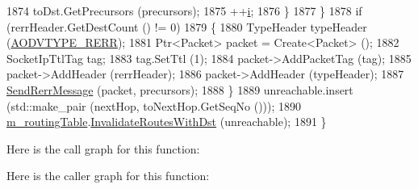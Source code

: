 \begin{DoxyCode}
1874           toDst.GetPrecursors (precursors);
1875           ++\hyperlink{bernuolliDistribution_8m_a6f6ccfcf58b31cb6412107d9d5281426}{i};
1876         \}
1877     \}
1878   \textcolor{keywordflow}{if} (rerrHeader.GetDestCount () != 0)
1879     \{
1880       TypeHeader typeHeader (\hyperlink{namespacens3_1_1aodv_a8cf417608302ba0ed75225c976944d44a363aea0c29a02f5899cf088654c6d844}{AODVTYPE\_RERR});
1881       Ptr<Packet> packet = Create<Packet> ();
1882       SocketIpTtlTag tag;
1883       tag.SetTtl (1);
1884       packet->AddPacketTag (tag);
1885       packet->AddHeader (rerrHeader);
1886       packet->AddHeader (typeHeader);
1887       \hyperlink{classns3_1_1aodv_1_1RoutingProtocol_abc216040fe7b7ac100ea7bf2ce9a0bdb}{SendRerrMessage} (packet, precursors);
1888     \}
1889   unreachable.insert (std::make\_pair (nextHop, toNextHop.GetSeqNo ()));
1890   \hyperlink{classns3_1_1aodv_1_1RoutingProtocol_a4e1003a34c8adc96db71096d88c98ae0}{m\_routingTable}.\hyperlink{classns3_1_1aodv_1_1RoutingTable_a18a8d2cfcba8e03de2a086e4dcaa7d2f}{InvalidateRoutesWithDst} (unreachable);
1891 \}
\end{DoxyCode}


Here is the call graph for this function\+:




Here is the caller graph for this function\+:


